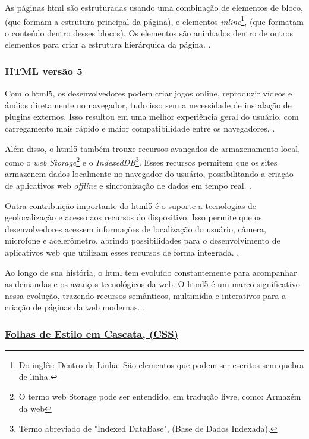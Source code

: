 As páginas
\acrshort{html}
são estruturadas usando uma combinação de elementos de bloco,
(que formam a estrutura principal da página), e elementos
\textit{inline}\footnote{Do inglês: Dentro da Linha. São elementos que podem ser escritos sem quebra de linha.
},
(que formatam o conteúdo
dentro desses blocos). Os elementos são aninhados dentro de outros elementos para criar a
estrutura hierárquica da página.
\cite{w3c}.

\subsubsection{\underline{HTML versão 5}}

Com o
\acrshort{html}5,
os desenvolvedores podem criar jogos online, reproduzir vídeos e
áudios diretamente no navegador, tudo isso sem a necessidade de instalação de plugins
externos. Isso resultou em uma melhor experiência geral do usuário, com carregamento mais
rápido e maior compatibilidade entre os navegadores.
\cite{w3c}.

Além disso, o
\acrshort{html}5
também trouxe recursos avançados de armazenamento local,
como o
\textit{\acrshort{web} Storage}\footnote{O termo
    \acrshort{web} Storage pode ser entendido, em tradução
    livre, como: Armazém da \acrshort{web}
}
e o
\textit{IndexedDB}\footnote{Termo abreviado de "Indexed DataBase", (Base de Dados Indexada).
}.
Esses recursos permitem que os sites armazenem dados
localmente no navegador do usuário, possibilitando a criação de aplicativos web
\textit{offline}
e
sincronização de dados em tempo real.
\cite{w3c}.

Outra contribuição importante do
\acrshort{html}5
é o suporte a tecnologias de
geolocalização e acesso aos recursos do dispositivo. Isso permite que os desenvolvedores
acessem informações de localização do usuário, câmera, microfone e acelerômetro, abrindo
possibilidades para o desenvolvimento de aplicativos web que utilizam esses recursos de
forma integrada.
\cite{w3c}.

Ao longo de sua história, o
\acrshort{html}
tem evoluído constantemente para acompanhar as
demandas e os avanços tecnológicos da web. O
\acrshort{html}5
é um marco significativo nessa
evolução, trazendo recursos semânticos, multimídia e interativos para a criação de páginas da
web modernas.
\cite{w3c}.

\subsubsection{\underline{Folhas de Estilo em Cascata, (CSS)}}

